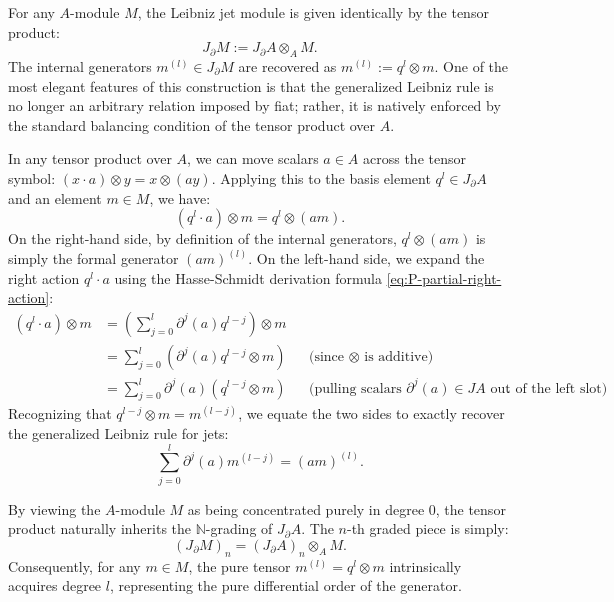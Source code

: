 \documentclass[a4paper, 12pt]{amsart}
\theoremstyle{definition}
\theoremstyle{remark}
\begin{document}
For any $A$-module $M$, the Leibniz jet module is given identically by the tensor product:
\begin{equation}
  \label{eq:JdM-tensor}
  J_\partial M := J_\partial A \otimes_A M.
\end{equation}
The internal generators $m^{(l)} \in J_\partial M$ are recovered as $m^{(l)} := q^l \otimes m$. One of the most elegant features of this construction is that the generalized Leibniz rule is no longer an arbitrary relation imposed by fiat; rather, it is natively enforced by the standard balancing condition of the tensor product over $A$. 

In any tensor product over $A$, we can move scalars $a \in A$ across the tensor symbol: $(x \cdot a) \otimes y = x \otimes (ay)$. Applying this to the basis element $q^l \in J_\partial A$ and an element $m \in M$, we have:
\begin{equation*}
  (q^l \cdot a) \otimes m = q^l \otimes (am).
\end{equation*}
On the right-hand side, by definition of the internal generators, $q^l \otimes (am)$ is simply the formal generator $(am)^{(l)}$. 
On the left-hand side, we expand the right action $q^l \cdot a$ using the Hasse-Schmidt derivation formula \eqref{eq:P-partial-right-action}:
\begin{align*}
  (q^l \cdot a) \otimes m &= \left( \sum_{j=0}^l \partial^j(a) q^{l-j} \right) \otimes m \\
  &= \sum_{j=0}^l \left( \partial^j(a) q^{l-j} \otimes m \right) && \text{(since $\otimes$ is additive)} \\
  &= \sum_{j=0}^l \partial^j(a) \left( q^{l-j} \otimes m \right) && \text{(pulling scalars $\partial^j(a) \in JA$ out of the left slot)}.
\end{align*}
Recognizing that $q^{l-j} \otimes m = m^{(l-j)}$, we equate the two sides to exactly recover the generalized Leibniz rule for jets:
\begin{equation*}
  \sum_{j=0}^l \partial^j(a) m^{(l-j)} = (am)^{(l)}.
\end{equation*}

By viewing the $A$-module $M$ as being concentrated purely in degree $0$, the tensor product naturally inherits the $\mathbb{N}$-grading of $J_\partial A$. The $n$-th graded piece is simply:
\begin{equation}
  \label{eq:JdM-n}
  (J_\partial M)_n = (J_\partial A)_n \otimes_A M.
\end{equation}
Consequently, for any $m \in M$, the pure tensor $m^{(l)} = q^l \otimes m$ intrinsically acquires degree $l$, representing the pure differential order of the generator.
\end{document}
